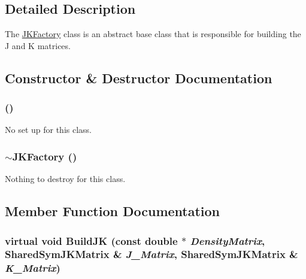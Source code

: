 \subsection{Detailed Description}
The \hyperlink{classJKBuilder_1_1JKFactory}{JKFactory} class is an abstract base class that is responsible for building the J and K matrices. 

\subsection{Constructor \& Destructor Documentation}
\hypertarget{classJKBuilder_1_1JKFactory_a05f3bfba8a8e2c8182393027e6cbbd5c}{
\subsubsection[{JKFactory}]{ ()}}
\label{classJKBuilder_1_1JKFactory_a05f3bfba8a8e2c8182393027e6cbbd5c}


No set up for this class. \hypertarget{classJKBuilder_1_1JKFactory_a9350f429f8b82b14409553f0a2245a7b}{
\subsubsection[{$\sim$JKFactory}]{\setlength{\rightskip}{0pt plus 5cm}$\sim${\bf JKFactory} ()}}
\label{classJKBuilder_1_1JKFactory_a9350f429f8b82b14409553f0a2245a7b}


Nothing to destroy for this class. 

\subsection{Member Function Documentation}
\hypertarget{classJKBuilder_1_1JKFactory_ae253b309dafe3ce003fdabfd315318b8}{
\subsubsection[{BuildJK}]{\setlength{\rightskip}{0pt plus 5cm}virtual void BuildJK (const double $\ast$ {\em DensityMatrix}, \/  {\bf SharedSymJKMatrix} \& {\em J\_\-Matrix}, \/  {\bf SharedSymJKMatrix} \& {\em K\_\-Matrix})}}
\label{classJKBuilder_1_1JKFactory_ae253b309dafe3ce003fdabfd315318b8}


